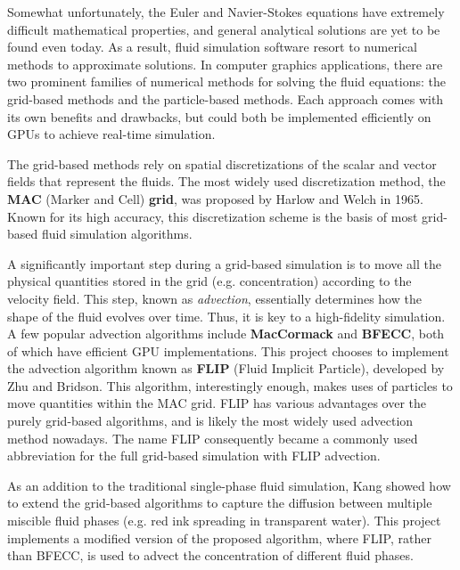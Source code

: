 Somewhat unfortunately, the Euler and Navier-Stokes equations have extremely difficult mathematical properties, and general analytical solutions are yet to be found even today. As a result, fluid simulation software resort to numerical methods to approximate solutions. In computer graphics applications, there are two prominent families of numerical methods for solving the fluid equations: the grid-based methods and the particle-based methods. Each approach comes with its own benefits and drawbacks, but could both be implemented efficiently on GPUs to achieve real-time simulation.

The grid-based methods rely on spatial discretizations of the scalar and vector fields that represent the fluids. The most widely used discretization method, the \textbf{MAC} (Marker and Cell) \textbf{grid}, was proposed by Harlow and Welch\cite{harlow1965numerical} in 1965. Known for its high accuracy, this discretization scheme is the basis of most grid-based fluid simulation algorithms. 

A significantly important step during a grid-based simulation is to move all the physical quantities stored in the grid (e.g. concentration) according to the velocity field. This step, known as \textit{advection}, essentially determines how the shape of the fluid evolves over time. Thus, it is key to a high-fidelity simulation. A few popular advection algorithms include \textbf{MacCormack}\cite{selle2008unconditionally} and \textbf{BFECC}\cite{kim2005flowfixer}, both of which have efficient GPU implementations\cite{chentanez2011real}\cite{xu2011interactive}. This project chooses to implement the advection algorithm known as \textbf{FLIP} (Fluid Implicit Particle)\cite{zhu2005animating}, developed by Zhu and Bridson. This algorithm, interestingly enough, makes uses of particles to move quantities within the MAC grid. FLIP has various advantages over the purely grid-based algorithms, and is likely the most widely used advection method nowadays. The name FLIP consequently became a commonly used abbreviation for the full grid-based simulation with FLIP advection.

As an addition to the traditional single-phase fluid simulation, Kang\cite{kang2010hybrid} showed how to extend the grid-based algorithms to capture the diffusion between multiple miscible fluid phases (e.g. red ink spreading in transparent water). This project implements a modified version of the proposed algorithm, where FLIP, rather than BFECC, is used to advect the concentration of different fluid phases.



